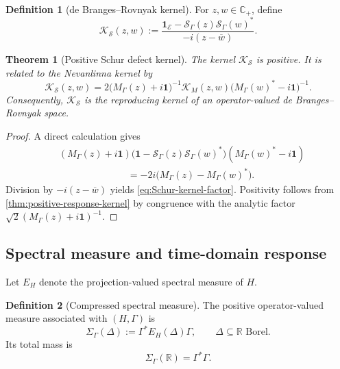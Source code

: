 \documentclass[11pt,reqno]{scrartcl}
\newcommand{\RR}{\mathbb R}
\newcommand{\idop}{\mathbf 1}
\newcommand{\scrE}{\mathscr E}
\newcommand{\Mresp}{M_{\Gamma}}
\newcommand{\Sresp}{\mathscr S_{\Gamma}}
\newcommand{\KM}{\mathcal K_{M}}
\newcommand{\KS}{\mathcal K_{\mathscr S}}
\newcommand{\Cplus}{\mathbb C_{+}}
\theoremstyle{plain}
\newtheorem{theorem}{Theorem}[section]
\theoremstyle{definition}
\newtheorem{definition}[definition]{Definition}
\theoremstyle{remark}
\begin{document}
\begin{definition}[de Branges--Rovnyak kernel]
\label{def:dBR-kernel}
For \(z,w\in\Cplus\), define
\begin{equation}
  \KS(z,w)
  :=\frac{\idop_{\scrE}-\Sresp(z)\Sresp(w)^*}
  {-i(z-\overline w)}.
  \label{eq:dBR-kernel}
\end{equation}
\end{definition}

\begin{theorem}[Positive Schur defect kernel]
\label{thm:positive-Schur-kernel}
The kernel \(\KS\) is positive.  It is related to the Nevanlinna kernel by
\begin{equation}
  \boxed{
  \KS(z,w)
  =2\bigl(\Mresp(z)+i\idop\bigr)^{-1}
  \KM(z,w)
  \bigl(\Mresp(w)^*-i\idop\bigr)^{-1}.}
  \label{eq:Schur-kernel-factor}
\end{equation}
Consequently, \(\KS\) is the reproducing kernel of an operator-valued
de Branges--Rovnyak space.
\end{theorem}

\begin{proof}
A direct calculation gives
\begin{align}
 &(\Mresp(z)+i\idop)
  \bigl(\idop-\Sresp(z)\Sresp(w)^*\bigr)
  (\Mresp(w)^*-i\idop)\\
 &\hspace{3cm}=-2i\bigl(\Mresp(z)-\Mresp(w)^*\bigr).
\end{align}
Division by \(-i(z-\overline w)\) yields
\eqref{eq:Schur-kernel-factor}.  Positivity follows from
\cref{thm:positive-response-kernel} by congruence with the analytic factor
\(\sqrt2(\Mresp(z)+i\idop)^{-1}\).
\end{proof}

\subsection{Spectral measure and time-domain response}

Let \(E_H\) denote the projection-valued spectral measure of \(H\).

\begin{definition}[Compressed spectral measure]
\label{def:compressed-spectral-measure}
The positive operator-valued measure associated with \((H,\Gamma)\) is
\begin{equation}
  \Sigma_\Gamma(\Delta)
  :=\Gamma^*E_H(\Delta)\Gamma,
  \qquad \Delta\subseteq\RR\text{ Borel}.
  \label{eq:compressed-spectral-measure}
\end{equation}
Its total mass is
\begin{equation}
  \Sigma_\Gamma(\RR)=\Gamma^*\Gamma.
  \label{eq:spectral-measure-total-mass}
\end{equation}
\end{definition}
\end{document}

